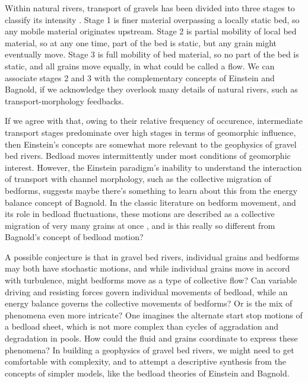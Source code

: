 \documentclass{article}
\begin{document}
Within natural rivers, transport of gravels has been divided into three stages to classify its intensity \cite{Jackson1982, Ashworth1989}. 
Stage 1 is finer material overpassing a locally static bed, so any mobile material originates upstream. 
Stage 2 is partial mobility of local bed material, so at any one time, part of the bed is static, but any grain might eventually move. 
Stage 3 is full mobility of bed material, so no part of the bed is static, and all grains move equally, in what could be called a flow. 
We can associate stages 2 and 3 with the complementary concepts of Einstein and Bagnold, if we acknowledge they overlook many details of natural rivers, such as transport-morphology feedbacks. 

If we agree with \citet{Wolman1960} that, owing to their relative frequency of occurence, intermediate transport stages predominate over high stages in terms of geomorphic influence, then Einstein's concepts are somewhat more relevant to the geophysics of gravel bed rivers. 
Bedload moves intermittently under most conditions of geomorphic interest. 
However, the Einstein paradigm's inability to understand the interaction of transport with channel morphology, such as the collective migration of bedforms, suggests maybe there's something to learn about this from the energy balance concept of Bagnold. In the classic literature on bedform movement, and its role in bedload fluctuations, these motions are described as a collective migration of very many grains at once \citep{Whiting1988, Hoey1992, Cudden2003}, and is this really so different from Bagnold's concept of bedload motion? 

A possible conjecture is that in gravel bed rivers, individual grains and bedforms may both have stochastic motions, and while individual grains move in accord with turbulence, might bedforms move as a type of collective flow? 
Can variable driving and resisting forces govern individual movements of bedload, while an energy balance governs the collective movements of bedforms? 
Or is the mix of phenomena even more intricate? 
One imagines the alternate start stop motions of a bedload sheet, which is not more complex than cycles of aggradation and degradation in pools. 
How could the fluid and grains coordinate to express these phenomena? 
In building a geophysics of gravel bed rivers, we might need to get comfortable with complexity, and to attempt a descriptive synthesis from the concepts of simpler models, like the bedload theories of Einstein and Bagnold.  



\end{document}
